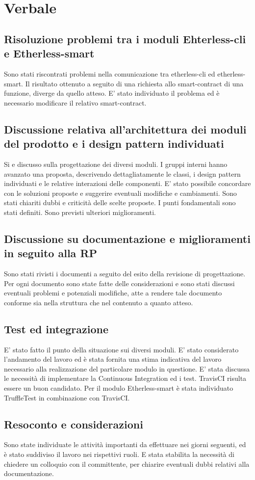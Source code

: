 \section{Verbale}
	\subsection{Risoluzione problemi tra i moduli Ehterless-cli e Etherless-smart}
	 Sono stati riscontrati problemi nella comunicazione tra etherless-cli ed etherless-smart. Il risultato ottenuto a seguito di una richiesta allo smart-contract di una funzione, diverge da quello atteso. E' stato individuato il problema ed è necessario modificare il relativo smart-contract.
	\subsection{Discussione relativa all'architettura dei moduli del prodotto e i design pattern individuati}
	Si e discusso sulla progettazione dei diversi moduli. I gruppi interni hanno avanzato una proposta, descrivendo dettagliatamente le classi, i design pattern individuati e le relative interazioni delle componenti. E' stato possibile concordare con le soluzioni proposte e suggerire eventuali modifiche e cambiamenti. Sono stati chiariti dubbi e criticità delle scelte proposte. I punti fondamentali sono stati definiti. Sono previsti ulteriori miglioramenti.
	\subsection{Discussione su documentazione e miglioramenti in seguito alla RP}
	Sono stati rivisti i documenti a seguito del esito della revisione di progettazione. Per ogni documento sono state fatte delle considerazioni e sono stati discussi eventuali problemi e potenziali modifiche, atte a rendere tale documento conforme sia nella struttura che nel contenuto a quanto atteso.
	\subsection{Test ed integrazione}
	E’ stato fatto il punto della situazione sui diversi moduli. E' stato considerato l’andamento del lavoro ed è stata fornita una stima indicativa del lavoro necessario alla realizzazione del particolare modulo in questione. E’ stata discussa le necessità di implementare la Continuous Integration ed i test. TravisCI risulta essere un buon candidato. Per il modulo Etherless-smart è stata individuato TruffleTest in combinazione con TravisCI.
	\subsection{Resoconto e considerazioni}
	Sono state individuate le attività importanti da effettuare nei giorni seguenti, ed è stato suddiviso il lavoro nei rispettivi ruoli. E stata stabilita la necessità di chiedere un colloquio con il committente, per chiarire eventuali dubbi relativi alla documentazione.